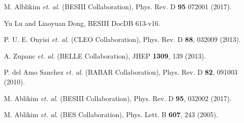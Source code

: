 \begin{thebibliography}{99}
M. Alblikim {\it et. al.}  (BESIII Collaboration),
Phys. Rev. D \textbf{95} 072001 (2017).


Yu Lu and Liaoyuan Dong, 
BESIII DocDB 613-v16.

P. U. E. Onyisi {\it et. al.}  (CLEO Collaboration),
Phys. Rev. D \textbf{88}, 032009 (2013).

A. Zupanc {\it et. al.}  (BELLE Collaboration),
JHEP \textbf{1309}, 139 (2013).

P. del Amo Sanchez {\it et. al.}  (BABAR Collaboration),
Phys. Rev. D \textbf{82}, 091003 (2010).

M. Ablikim {\it et. al.} (BESIII Collaboration),
Phys. Rev. D \textbf{95}, 032002 (2017).

    M. Ablikim {\it et. al.} (BES Collaboration),
    Phys. Lett. B \textbf{607}, 243 (2005).


\end{thebibliography}

